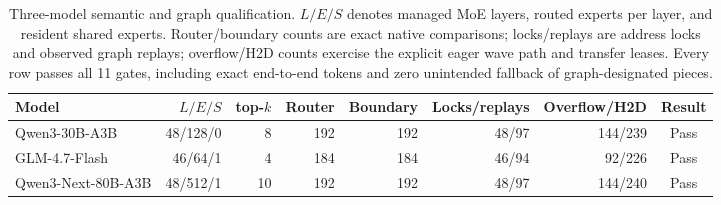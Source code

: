 \begin{table}[t]
  \centering
  \small
  \caption{Three-model semantic and graph qualification. $L/E/S$ denotes managed MoE layers, routed experts per layer, and resident shared experts. Router/boundary counts are exact native comparisons; locks/replays are address locks and observed graph replays; overflow/H2D counts exercise the explicit eager wave path and transfer leases. Every row passes all 11 gates, including exact end-to-end tokens and zero unintended fallback of graph-designated pieces.}
  \label{tab:qualification}
  \begin{tabular}{lrrrrrrc}
    \toprule
    Model & $L/E/S$ & top-$k$ & Router & Boundary & Locks/replays & Overflow/H2D & Result \\
    \midrule
    Qwen3-30B-A3B & 48/128/0 & 8 & 192 & 192 & 48/97 & 144/239 & Pass \\
    GLM-4.7-Flash & 46/64/1 & 4 & 184 & 184 & 46/94 & 92/226 & Pass \\
    Qwen3-Next-80B-A3B & 48/512/1 & 10 & 192 & 192 & 48/97 & 144/240 & Pass \\
    \bottomrule
  \end{tabular}
\end{table}
